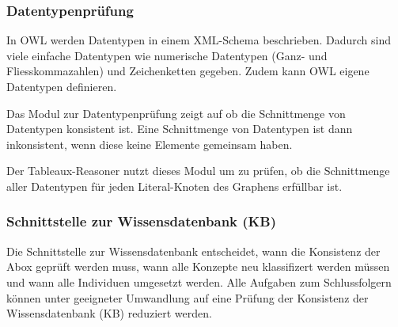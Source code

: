 %
%
%

%


\subsubsection{Datentypenprüfung}
\label{ssubsection:inferenz_pellet_datatypes}
In OWL werden Datentypen in einem XML-Schema beschrieben. Dadurch sind viele einfache Datentypen wie numerische Datentypen (Ganz- und Fliesskommazahlen) und Zeichenketten gegeben. Zudem kann OWL eigene Datentypen definieren.

Das Modul zur Datentypenprüfung zeigt auf ob die Schnittmenge von Datentypen konsistent ist. Eine Schnittmenge von Datentypen ist dann inkonsistent, wenn diese keine Elemente gemeinsam haben.

Der Tableaux-Reasoner nutzt dieses Modul um zu prüfen, ob die Schnittmenge aller Datentypen für jeden Literal-Knoten des Graphens erfüllbar ist.

\subsubsection{Schnittstelle zur Wissensdatenbank (KB)}
\label{ssubsection:inferenz_pellet_kb}
Die Schnittstelle zur Wissensdatenbank entscheidet, wann die Konsistenz der Abox geprüft werden muss, wann alle Konzepte neu klassifizert werden müssen und wann alle Individuen umgesetzt werden. Alle Aufgaben zum Schlussfolgern können unter geeigneter Umwandlung auf eine Prüfung der Konsistenz der Wissensdatenbank (KB) reduziert werden.

